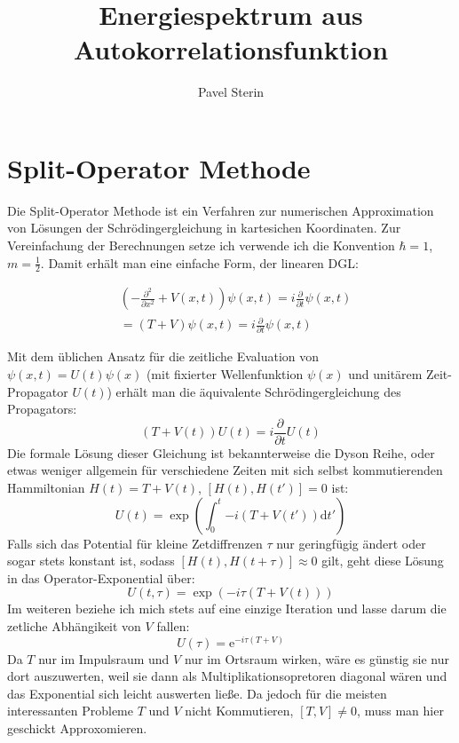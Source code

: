 \documentclass[10pt,a4paper,german]{scrartcl}
\title{Energiespektrum aus Autokorrelationsfunktion}
\author{Pavel Sterin}
\begin{document}
	\maketitle
	\section{Split-Operator Methode}
		Die Split-Operator Methode ist ein Verfahren zur numerischen Approximation
		von Lösungen der Schrödingergleichung in kartesichen Koordinaten. Zur Vereinfachung
		der Berechnungen setze ich verwende ich die Konvention $\hbar = 1$, $m=\frac{1}{2}$.
		Damit erhält man eine einfache Form, der linearen DGL:

		\begin{align*}
				&\left(-\frac{\partial^2}{\partial x^2} + V(x,t)\right)\psi(x,t)
					= i \frac{\partial}{\partial t}\psi(x,t) \\
				&= \left(T + V\right)\psi(x,t)
					= i \frac{\partial}{\partial t}\psi(x,t)
		\end{align*}

		Mit dem üblichen Ansatz für die zeitliche Evaluation von $ \psi(x,t)=U(t)\psi(x) $
		(mit fixierter Wellenfunktion $\psi(x)$ und unitärem Zeit-Propagator $U(t)$)
		erhält man	die äquivalente Schrödingergleichung des Propagators:
		\begin{equation*}
			\left(T + V(t)\right) U(t) = i  \frac{\partial}{\partial t}U(t)
		\end{equation*}
		Die formale Lösung dieser Gleichung ist bekannterweise die Dyson Reihe, oder etwas
		weniger allgemein für verschiedene Zeiten mit sich selbst kommutierenden
		Hammiltonian $H(t)=T+V(t)$, $[H(t),H(t')]=0$ ist:
		\begin{equation*}
			U(t)=\exp\left(\int_{0}^{t}{-i (T+V(t')) \mathrm{d} t'}\right)
		\end{equation*}
		Falls sich das Potential für kleine Zetdiffrenzen $\tau$ nur geringfügig ändert oder
		sogar stets konstant ist, sodass $[H(t),H(t+\tau)]\approx 0$ gilt, geht diese Lösung
		in das Operator-Exponential über:
		\begin{equation*}
			U(t,\tau)=\exp\left(-i \tau (T+V(t))\right)
		\end{equation*}
		Im weiteren beziehe ich mich stets auf eine einzige Iteration und lasse darum die
		zetliche Abhängikeit von $V$ fallen:
		\begin{equation}\label{eq:exp}
			U(\tau)=\mathrm{e}^{-i \tau (T+V)}
		\end{equation}
		Da $T$ nur im Impulsraum und $V$ nur im Ortsraum wirken, wäre es günstig sie
		nur dort auszuwerten, weil sie dann als Multiplikationsopretoren diagonal
		wären und	das Exponential sich leicht auswerten ließe. Da jedoch für die
		meisten interessanten Probleme $T$ und $V$ nicht Kommutieren, $[T,V]\neq 0$,
		muss man hier geschickt	Approxomieren.
\end{document}
